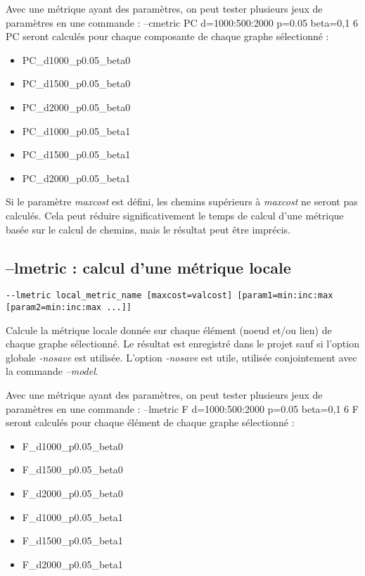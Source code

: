 \documentclass[a4paper,10pt]{report}
\newenvironment{cmd}
{\quote\Verbatim}
{\endVerbatim\endquote}
\begin{document}
Avec une métrique ayant des paramètres, on peut tester plusieurs jeux de paramètres en une commande :
\begin{cmd}
--cmetric PC d=1000:500:2000 p=0.05 beta=0,1
\end{cmd}
6 PC seront calculés pour chaque composante de chaque graphe sélectionné :
\begin{itemize}
 \item PC\_d1000\_p0.05\_beta0
 \item PC\_d1500\_p0.05\_beta0
 \item PC\_d2000\_p0.05\_beta0
 \item PC\_d1000\_p0.05\_beta1
 \item PC\_d1500\_p0.05\_beta1
 \item PC\_d2000\_p0.05\_beta1
\end{itemize}

Si le paramètre \textit{maxcost} est défini, les chemins supérieurs à \textit{maxcost} ne seront pas calculés. 
Cela peut réduire significativement le temps de calcul d'une métrique basée sur le calcul de chemins, mais le résultat peut être imprécis.

\subsection{--lmetric : calcul d'une métrique locale}
\begin{verbatim}
--lmetric local_metric_name [maxcost=valcost] [param1=min:inc:max [param2=min:inc:max ...]] 
\end{verbatim}
Calcule la métrique locale donnée sur chaque élément (noeud et/ou lien) de chaque graphe sélectionné.
Le résultat est enregistré dans le projet sauf si l'option globale \textit{-nosave} est utilisée. L'option \textit{-nosave} est utile, utilisée conjointement avec la commande \textit{--model}.

Avec une métrique ayant des paramètres, on peut tester plusieurs jeux de paramètres en une commande :
\begin{cmd}
--lmetric F d=1000:500:2000 p=0.05 beta=0,1
\end{cmd}
6 F seront calculés pour chaque élément de chaque graphe sélectionné :
\begin{itemize}
 \item F\_d1000\_p0.05\_beta0
 \item F\_d1500\_p0.05\_beta0
 \item F\_d2000\_p0.05\_beta0
 \item F\_d1000\_p0.05\_beta1
 \item F\_d1500\_p0.05\_beta1
 \item F\_d2000\_p0.05\_beta1
\end{itemize}
\end{document}
